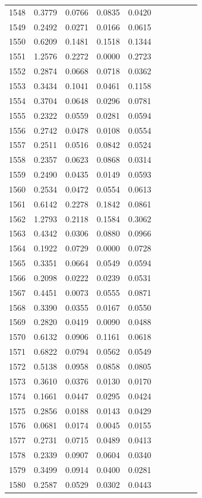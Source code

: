 \begin{table}
\begin{tabular}{cccccccccc}
1548& 0.3779& 0.0766& 0.0835& 0.0420\\ 
1549& 0.2492& 0.0271& 0.0166& 0.0615\\ 
1550& 0.6209& 0.1481& 0.1518& 0.1344\\ 
1551& 1.2576& 0.2272& 0.0000& 0.2723\\ 
1552& 0.2874& 0.0668& 0.0718& 0.0362\\ 
1553& 0.3434& 0.1041& 0.0461& 0.1158\\ 
1554& 0.3704& 0.0648& 0.0296& 0.0781\\ 
1555& 0.2322& 0.0559& 0.0281& 0.0594\\ 
1556& 0.2742& 0.0478& 0.0108& 0.0554\\ 
1557& 0.2511& 0.0516& 0.0842& 0.0524\\ 
1558& 0.2357& 0.0623& 0.0868& 0.0314\\ 
1559& 0.2490& 0.0435& 0.0149& 0.0593\\ 
1560& 0.2534& 0.0472& 0.0554& 0.0613\\ 
1561& 0.6142& 0.2278& 0.1842& 0.0861\\ 
1562& 1.2793& 0.2118& 0.1584& 0.3062\\ 
1563& 0.4342& 0.0306& 0.0880& 0.0966\\ 
1564& 0.1922& 0.0729& 0.0000& 0.0728\\ 
1565& 0.3351& 0.0664& 0.0549& 0.0594\\ 
1566& 0.2098& 0.0222& 0.0239& 0.0531\\ 
1567& 0.4451& 0.0073& 0.0555& 0.0871\\ 
1568& 0.3390& 0.0355& 0.0167& 0.0550\\ 
1569& 0.2820& 0.0419& 0.0090& 0.0488\\ 
1570& 0.6132& 0.0906& 0.1161& 0.0618\\ 
1571& 0.6822& 0.0794& 0.0562& 0.0549\\ 
1572& 0.5138& 0.0958& 0.0858& 0.0805\\ 
1573& 0.3610& 0.0376& 0.0130& 0.0170\\ 
1574& 0.1661& 0.0447& 0.0295& 0.0424\\ 
1575& 0.2856& 0.0188& 0.0143& 0.0429\\ 
1576& 0.0681& 0.0174& 0.0045& 0.0155\\ 
1577& 0.2731& 0.0715& 0.0489& 0.0413\\ 
1578& 0.2339& 0.0907& 0.0604& 0.0340\\ 
1579& 0.3499& 0.0914& 0.0400& 0.0281\\ 
1580& 0.2587& 0.0529& 0.0302& 0.0443\\ 

\end{tabular}
\end{table}
